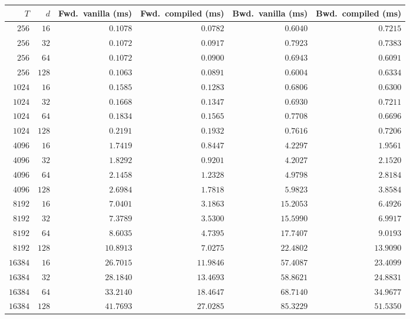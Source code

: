 \begin{tabular}{rrrrrr}
  \toprule
  $T$ & $d$ & Fwd.\ vanilla (ms) & Fwd.\ compiled (ms) & Bwd.\ vanilla (ms) & Bwd.\ compiled (ms) \\
  \midrule
  $256$ & $16$ & $0.1078$ & $0.0782$ & $0.6040$ & $0.7215$ \\
  $256$ & $32$ & $0.1072$ & $0.0917$ & $0.7923$ & $0.7383$ \\
  $256$ & $64$ & $0.1072$ & $0.0900$ & $0.6943$ & $0.6091$ \\
  $256$ & $128$ & $0.1063$ & $0.0891$ & $0.6004$ & $0.6334$ \\
  $1024$ & $16$ & $0.1585$ & $0.1283$ & $0.6806$ & $0.6300$ \\
  $1024$ & $32$ & $0.1668$ & $0.1347$ & $0.6930$ & $0.7211$ \\
  $1024$ & $64$ & $0.1834$ & $0.1565$ & $0.7708$ & $0.6696$ \\
  $1024$ & $128$ & $0.2191$ & $0.1932$ & $0.7616$ & $0.7206$ \\
  $4096$ & $16$ & $1.7419$ & $0.8447$ & $4.2297$ & $1.9561$ \\
  $4096$ & $32$ & $1.8292$ & $0.9201$ & $4.2027$ & $2.1520$ \\
  $4096$ & $64$ & $2.1458$ & $1.2328$ & $4.9798$ & $2.8184$ \\
  $4096$ & $128$ & $2.6984$ & $1.7818$ & $5.9823$ & $3.8584$ \\
  $8192$ & $16$ & $7.0401$ & $3.1863$ & $15.2053$ & $6.4926$ \\
  $8192$ & $32$ & $7.3789$ & $3.5300$ & $15.5990$ & $6.9917$ \\
  $8192$ & $64$ & $8.6035$ & $4.7395$ & $17.7407$ & $9.0193$ \\
  $8192$ & $128$ & $10.8913$ & $7.0275$ & $22.4802$ & $13.9090$ \\
  $16384$ & $16$ & $26.7015$ & $11.9846$ & $57.4087$ & $23.4099$ \\
  $16384$ & $32$ & $28.1840$ & $13.4693$ & $58.8621$ & $24.8831$ \\
  $16384$ & $64$ & $33.2140$ & $18.4647$ & $68.7140$ & $34.9677$ \\
  $16384$ & $128$ & $41.7693$ & $27.0285$ & $85.3229$ & $51.5350$ \\
  \bottomrule
\end{tabular}
